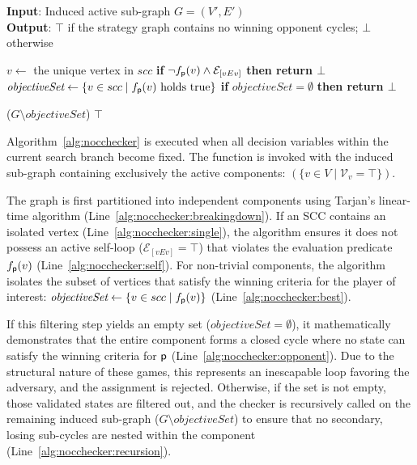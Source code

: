 \documentclass[a4paper,fleqn]{cas-sc}
\begin{document}
\begin{algorithm}[htb]
\small
\caption{\textbf{\nocchecker}}
\textbf{Input}: Induced active sub-graph $G = (V', E')$ \\
\textbf{Output}: $\top$ if the strategy graph contains no winning opponent cycles; $\bot$ otherwise
\begin{algorithmic}[1]
     \label{alg:nocchecker:breakingdown}
         \label{alg:nocchecker:single}
            \STATE $v \gets$ the unique vertex in $scc$
            \STATE \textbf{if } $\neg f_{\mathsf{p}}(v) \land \mathcal{E}_{[vEv]}$ \textbf{then return $\bot$} \label{alg:nocchecker:self}  
        \ELSE
            \STATE $ \textit{objectiveSet} \gets \{ v \in scc \mid 
            f_{\mathsf{p}}(v) \text{ holds true}
            \}$ \label{alg:nocchecker:best}
            \STATE \textbf{if } $ \textit{objectiveSet} = \emptyset$ \textbf{then return $\bot$} \label{alg:nocchecker:opponent}

            \STATE \nocchecker($G \setminus \textit{objectiveSet}$) \label{alg:nocchecker:recursion}
        \ENDIF
    \ENDFOR
    \RETURN $\top$
\end{algorithmic}
\label{alg:nocchecker}
\end{algorithm}

Algorithm~\ref{alg:nocchecker} is executed when all decision variables within the current search branch become fixed. The function is invoked with the induced sub-graph containing exclusively the active components: \nocchecker$(\{ v \in V \mid \mathcal{V}_v = \top \})$.

The graph is first partitioned into independent components using Tarjan's linear-time algorithm (Line~\ref{alg:nocchecker:breakingdown}). If an SCC contains an isolated vertex (Line~\ref{alg:nocchecker:single}), the algorithm ensures it does not possess an active self-loop ($\mathcal{E}_{[vEv]} = \top$) that violates the evaluation predicate $f_{\mathsf{p}}(v)$ (Line~\ref{alg:nocchecker:self}). For non-trivial components, the algorithm isolates the subset of vertices that satisfy the winning criteria for the player of interest: $\textit{objectiveSet} \gets \{ v \in scc \mid f_{\mathsf{p}}(v) \}$ (Line~\ref{alg:nocchecker:best}). 

If this filtering step yields an empty set ($\textit{objectiveSet} = \emptyset$), it mathematically demonstrates that the entire component forms a closed cycle where no state can satisfy the winning criteria for $\mathsf{p}$ (Line~\ref{alg:nocchecker:opponent}). Due to the structural nature of these games, this represents an inescapable loop favoring the adversary, and the assignment is rejected. Otherwise, if the set is not empty, those validated states are filtered out, and the checker is recursively called on the remaining induced sub-graph ($G \setminus \textit{objectiveSet}$) to ensure that no secondary, losing sub-cycles are nested within the component (Line~\ref{alg:nocchecker:recursion}).
\end{document}
